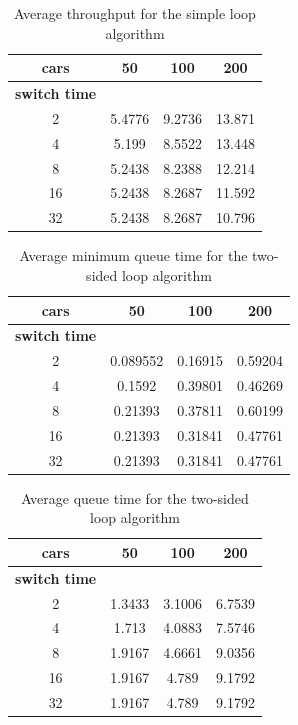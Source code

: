 \documentclass[a4paper,11pt]{article}
\begin{document}
\begin{table}[htb]
\centering
\begin{tabular}{cccc}
\hline
\textbf{cars} & 50 & 100 & 200\\
\hline
\textbf{switch time} & & & \\
2 & 5.4776 & 9.2736 & 13.871 \\
4 & 5.199 & 8.5522 & 13.448 \\
8 & 5.2438 & 8.2388 & 12.214 \\
16 & 5.2438 & 8.2687 & 11.592 \\
32 & 5.2438 & 8.2687 & 10.796 \\
\hline
\end{tabular}
\label{tab:simpleloopcars}
\caption{Average throughput for the simple loop algorithm}
\end{table}


\begin{table}[htb]
\centering
\begin{tabular}{cccc}
\hline
\textbf{cars} & 50 & 100 & 200\\
\hline
\textbf{switch time} & & & \\
2 & 0.089552 & 0.16915 & 0.59204 \\
4 & 0.1592 & 0.39801 & 0.46269 \\
8 & 0.21393 & 0.37811 & 0.60199 \\
16 & 0.21393 & 0.31841 & 0.47761 \\
32 & 0.21393 & 0.31841 & 0.47761 \\
\hline
\end{tabular}
\label{tab:twoloopmintime}
\caption{Average minimum queue time for the two-sided loop algorithm}
\end{table}

\begin{table}[htb]
\centering
\begin{tabular}{cccc}
\hline
\textbf{cars} & 50 & 100 & 200\\
\hline
\textbf{switch time} & & & \\
2 & 1.3433 & 3.1006 & 6.7539 \\
4 & 1.713 & 4.0883 & 7.5746 \\
8 & 1.9167 & 4.6661 & 9.0356 \\
16 & 1.9167 & 4.789 & 9.1792 \\
32 & 1.9167 & 4.789 & 9.1792 \\
\hline
\end{tabular}
\label{tab:twoloopavgtime}
\caption{Average queue time for the two-sided loop algorithm}
\end{table}
\end{document}
